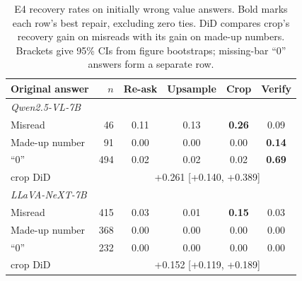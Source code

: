 \begin{table}[t]
\centering\small
\setlength{\tabcolsep}{3pt}
\begin{tabular}{lrcccc}
\toprule
Original answer & $n$ & Re-ask & Upsample & Crop & Verify \\
\midrule
\multicolumn{6}{l}{\textit{Qwen2.5-VL-7B}} \\
Misread & 46 & 0.11 & 0.13 & \textbf{0.26} & 0.09 \\
Made-up number & 91 & 0.00 & 0.00 & 0.00 & \textbf{0.14} \\
``0'' & 494 & 0.02 & 0.02 & 0.02 & \textbf{0.69} \\
\quad crop DiD & & \multicolumn{4}{c}{+0.261 [+0.140, +0.389]} \\
\midrule
\multicolumn{6}{l}{\textit{LLaVA-NeXT-7B}} \\
Misread & 415 & 0.03 & 0.01 & \textbf{0.15} & 0.03 \\
Made-up number & 368 & 0.00 & 0.00 & 0.00 & 0.00 \\
``0'' & 232 & 0.00 & 0.00 & 0.00 & 0.00 \\
\quad crop DiD & & \multicolumn{4}{c}{+0.152 [+0.119, +0.189]} \\
\bottomrule
\end{tabular}
\caption{E4 recovery rates on initially wrong value answers. Bold marks each
row's best repair, excluding zero ties. DiD compares crop's recovery gain on
misreads with its gain on made-up numbers. Brackets give 95\% CIs from figure
bootstraps; missing-bar ``0'' answers form a separate row.}
\label{tab:e4}
\end{table}
